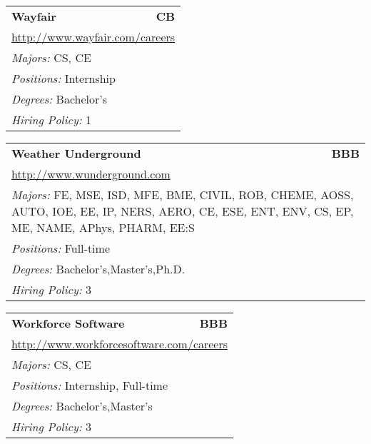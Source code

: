 \documentclass[twoside]{article}
\begin{document}
\begin{center}
\begin{multicols}{3}
\begin{FlushLeft}
\begin{minipage}{\columnwidth}
\end{minipage}
 
\begin{minipage}{\columnwidth}\begin{tabularx}{.95\columnwidth}{Xr}
                 {\Large\bf Wayfair} & {\Large\bf CB}\\
    \multicolumn{2}{p{.95\columnwidth}}{\url{http://www.wayfair.com/careers}}\\
    \multicolumn{2}{p{.95\columnwidth}}{\emph{Majors:} CS, CE}\\
    \multicolumn{2}{p{.95\columnwidth}}{\emph{Positions:} Internship}\\
    \multicolumn{2}{p{.95\columnwidth}}{\emph{Degrees:} Bachelor's}\\
    \multicolumn{2}{p{.95\columnwidth}}{\emph{Hiring Policy:} 1}\\
    \end{tabularx}
    
\end{minipage}
 
\begin{minipage}{\columnwidth}\begin{tabularx}{.95\columnwidth}{Xr}
                 {\Large\bf Weather Underground} & {\Large\bf BBB}\\
    \multicolumn{2}{p{.95\columnwidth}}{\url{http://www.wunderground.com}}\\
    \multicolumn{2}{p{.95\columnwidth}}{\emph{Majors:} FE, MSE, ISD, MFE, BME, CIVIL, ROB, CHEME, AOSS, AUTO, IOE, EE, IP, NERS, AERO, CE, ESE, ENT, ENV, CS, EP, ME, NAME, APhys, PHARM, EE:S}\\
    \multicolumn{2}{p{.95\columnwidth}}{\emph{Positions:} Full-time}\\
    \multicolumn{2}{p{.95\columnwidth}}{\emph{Degrees:} Bachelor's,Master's,Ph.D.}\\
    \multicolumn{2}{p{.95\columnwidth}}{\emph{Hiring Policy:} 3}\\
    \end{tabularx}
    
\end{minipage}
 
\begin{minipage}{\columnwidth}\begin{tabularx}{.95\columnwidth}{Xr}
                 {\Large\bf Workforce Software} & {\Large\bf BBB}\\
    \multicolumn{2}{p{.95\columnwidth}}{\url{http://www.workforcesoftware.com/careers}}\\
    \multicolumn{2}{p{.95\columnwidth}}{\emph{Majors:} CS, CE}\\
    \multicolumn{2}{p{.95\columnwidth}}{\emph{Positions:} Internship, Full-time}\\
    \multicolumn{2}{p{.95\columnwidth}}{\emph{Degrees:} Bachelor's,Master's}\\
    \multicolumn{2}{p{.95\columnwidth}}{\emph{Hiring Policy:} 3}\\
    \end{tabularx}
    

\end{minipage}
\end{FlushLeft}
\end{multicols}
\end{center}
\end{document}
